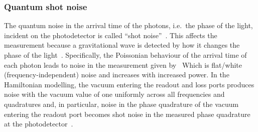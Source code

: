 \subsubsection{Quantum shot noise}

The quantum noise in the arrival time of the photons, i.e.\ the phase of the light, incident on the photodetector is called ``shot noise''~\cite{}. This affects the measurement because a gravitational wave is detected by how it changes the phase of the light~\cite{}. %
Specifically, the Poissonian behaviour of the arrival time of each photon leads to noise in the measurement given by~\cite{} 
Which is flat/white (frequency-independent) noise and increases with increased power.
In the Hamiltonian modelling, the vacuum entering the readout and loss ports produces noise with the vacuum value of one uniformly across all frequencies and quadratures and, in particular, noise in the phase quadrature of the vacuum entering the readout port becomes shot noise in the measured phase quadrature at the photodetector~\cite{}. 


